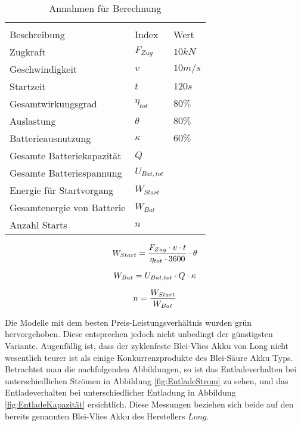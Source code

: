 \begin{table}[H]
	\centering
	\begin{tabular}{C{5cm} C{2.5cm} C{2cm}}
		\\
	{Beschreibung} & {Index} & {Wert} \\ \hline
	Zugkraft    &   $ F_{Zug} $    & $10 kN$   \\
	Geschwindigkeit    &   $ v $    & $10 m/s$   \\
	Startzeit    &   $ t $   & $120 s$   \\
	Gesamtwirkungsgrad    &  $ \eta_{tot} $    & $80\%$   \\
	Auslastung    &  $ \theta $   & $80\%$  \\
	Batterieausnutzung    &  $ \kappa $    & $60\%$   \\
	Gesamte Batteriekapazität   &   $ Q $    &   \\
	Gesamte Batteriespannung    &   $ U_{Bat,tot} $    &   \\
	Energie für Startvorgang    &   $ W_{Start} $    &   \\
	Gesamtenergie von Batterie   &   $ W_{Bat} $    &   \\
	Anzahl Starts    &   $ n $    &    \\	
	\end{tabular}
	\caption{Annahmen für Berechnung}
	\label{tab:BerechnungAnzahlStart}
\end{table}

\begin{equation}
\centering
	W_{Start}=\frac{F_{Zug}\cdot v \cdot t}{\eta_{tot}\cdot 3600}\cdot \theta
\label{eq:EnergieStart}
\end{equation}

\begin{equation}
\centering
	W_{Bat}=U_{Bat,tot}\cdot Q \cdot \kappa
\label{eq:EnergieBatterie}
\end{equation}

\begin{equation}
\centering
	n=\frac{W_{Start}}{W_{Bat}}
\label{eq:AnzahlStarts}
\end{equation}


Die Modelle mit dem besten Preis-Leistungsverhältnis wurden grün hervorgehoben. Diese entsprechen jedoch nicht unbedingt der günstigsten Variante. Augenfällig ist, dass der zyklenfeste Blei-Vlies Akku von Long nicht wesentlich teurer ist als einige Konkurrenzprodukte des Blei-Säure Akku Typs. Betrachtet man die nachfolgenden Abbildungen, so ist das Entladeverhalten bei unterschiedlichen Strömen in Abbildung \ref{fig:EntladeStrom} zu sehen, und das Entladeverhalten bei unterschiedlicher Entladung in Abbildung \ref{fig:EntladeKapazität} ersichtlich. Diese Messungen beziehen sich beide auf den bereits genannten Blei-Vlies Akku des Herstellers $Long$.


